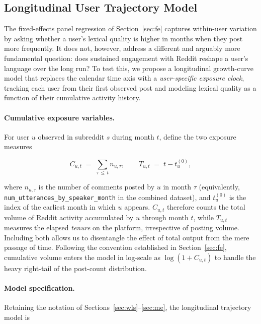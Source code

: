 
\subsection{Longitudinal User Trajectory Model}
\label{sec:longitudinal}

The fixed-effects panel regression of Section~\ref{sec:fe} captures
within-user variation by asking whether a user's lexical quality is
higher in months when they post more frequently.  It does not, however,
address a different and arguably more fundamental question: does
sustained engagement with Reddit reshape a user's language over the
long run?  To test this, we propose a longitudinal growth-curve model
that replaces the calendar time axis with a \emph{user-specific
exposure clock}, tracking each user from their first observed post
and modeling lexical quality as a function of their cumulative
activity history.

\paragraph{Cumulative exposure variables.}
For user $u$ observed in subreddit $s$ during month $t$, define the
two exposure measures

\begin{equation}
  C_{u,t} \;=\; \sum_{\tau \,\leq\, t} n_{u,\tau},
  \qquad
  T_{u,t} \;=\; t - t_{u}^{(0)},
  \label{eq:exposure}
\end{equation}

where $n_{u,\tau}$ is the number of comments posted by $u$ in month
$\tau$ (equivalently, \texttt{num\_utterances\_by\_speaker\_month}
in the combined dataset), and $t_{u}^{(0)}$ is the index of the
earliest month in which $u$ appears.  $C_{u,t}$ therefore counts
the total volume of Reddit activity accumulated by $u$ through month
$t$, while $T_{u,t}$ measures the elapsed \emph{tenure} on the
platform, irrespective of posting volume.  Including both allows us
to disentangle the effect of total output from the mere passage of
time.  Following the convention established in Section~\ref{sec:fe},
cumulative volume enters the model in log-scale as $\log(1 +
C_{u,t})$ to handle the heavy right-tail of the post-count
distribution.

\paragraph{Model specification.}
Retaining the notation of Sections~\ref{sec:wls}--\ref{sec:me}, the
longitudinal trajectory model is

